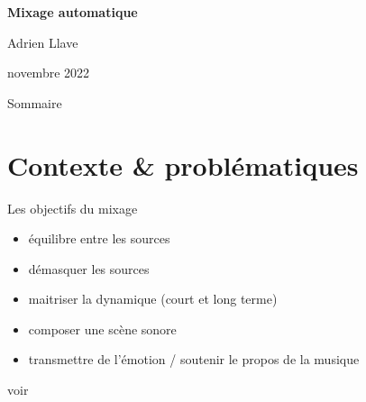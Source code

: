 \documentclass[9pt, aspectratio=169]{beamer}
\title{}
\author{Adrien Llave}
\institute{CentraleSupélec/IETR}
\begin{document}
\begin{withoutheadline}
\begin{withoutfootline}
\begin{frame}
	\vspace{0.5cm}
	\textbf{\large Mixage automatique}
	
	\vspace{0.7cm}
	{\small Adrien Llave}

	\footnotesize novembre 2022
\end{frame}
\end{withoutfootline}
\end{withoutheadline}

\begin{withoutheadline}
\begin{frame}{Sommaire}
	\tableofcontents[sectionstyle=show,subsectionstyle=show/shaded/hide,subsubsectionstyle=show/shaded/hide]
\end{frame}
\end{withoutheadline}


\section{Contexte \& problématiques}

\begin{frame}{Les objectifs du mixage} %

\pause
\begin{itemize}
	\item équilibre entre les sources
	\item démasquer les sources
	\item maitriser la dynamique (court et long terme)
	\item composer une scène sonore
	\item transmettre de l'émotion / soutenir le propos de la musique
\end{itemize}
voir \cite{owsinski_mixing_2013}
\end{frame}
\end{document}
